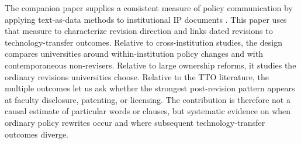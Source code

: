 The companion paper supplies a consistent measure of policy communication by applying text-as-data methods to institutional IP documents \citep{SharmaPCSI2026,LoughranMcDonald2011,GentzkowKellyTaddy2019,GrimmerRobertsStewart2022}. This paper uses that measure to characterize revision direction and links dated revisions to technology-transfer outcomes. Relative to cross-institution studies, the design compares universities around within-institution policy changes and with contemporaneous non-revisers. Relative to large ownership reforms, it studies the ordinary revisions universities choose. Relative to the TTO literature, the multiple outcomes let us ask whether the strongest post-revision pattern appears at faculty disclosure, patenting, or licensing. The contribution is therefore not a causal estimate of particular words or clauses, but systematic evidence on when ordinary policy rewrites occur and where subsequent technology-transfer outcomes diverge.
